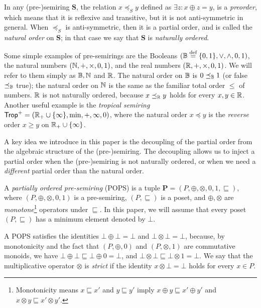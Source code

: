 In any (pre-)semiring $\bm S$, the relation $x \preceq_S y$ defined as
$\exists z: x \oplus z = y$, is a {\em preorder}, which means that it
is reflexive and transitive, but it is not anti-symmetric in general.
When $\preceq_S$ is anti-symmetric, then it is a partial order, and is
called the {\em natural order} on $\bm S$; in that case we say that
$\bm S$ is {\em naturally ordered}.

\begin{ex}
  Some simple examples of pre-semirings are the Booleans
  $(\mathbb B \stackrel{\text{def}}{=} \{0,1\}, \vee, \wedge, 0, 1)$, the natural numbers
  $(\mathbb N, +, \times , 0, 1)$, and the real numbers
  $(\mathbb R, +, \times, 0, 1)$.  We will refer to them simply as $\mathbb B, \mathbb N$
  and $\mathbb R$.  The natural order on $\mathbb B$ is $0 \preceq_\mathbb B 1$ (or {\sf
    false} $\preceq_\mathbb B$ {\sf true}); the natural order on $\mathbb N$ is the
  same as the familiar total order $\leq$ of numbers.  $\mathbb R$ is not
  naturally ordered, because $x \preceq_\mathbb R y$ holds for every
  $x,y \in \mathbb R$.  Another useful example is the {\em tropical semiring}
  $\text{\sf Trop}^+ = (\mathbb R_+ \cup \{\infty\}, \min,+, \infty, 0)$, where the
  natural order $x \preceq y$ is the {\em reverse} order $x \geq y$ on
  $\mathbb R_+ \cup \{\infty\}$.
\end{ex}


A key idea we introduce in this paper is the decoupling of the partial order from the
algebraic structure of the (pre-)semiring.
The decoupling allows us to inject a partial order when the (pre-)semiring is not
naturally ordered, or when we need a {\em different} partial order than the natural order.

\begin{defn}[POPS] \label{def:pops} A {\em partially ordered pre-semiring} (POPS) is a tuple
  $\bm P = (P, \oplus, \otimes, 0, 1, \sqsubseteq)$, where
  $(P, \oplus, \otimes, 0, 1)$ is a pre-semiring, $(P, \sqsubseteq)$
  is a poset, and $\oplus, \otimes$ are {\em monotone}\footnote{Monotonicity means
  $x\sqsubseteq x'$ and $y \sqsubseteq y'$ imply $x\oplus y \sqsubseteq x' \oplus y'$
  and $x \otimes y \sqsubseteq x' \otimes y'$.}
  operators under $\sqsubseteq$.
  In this paper, we will assume that every poset $(P, \sqsubseteq)$ has a minimum
  element denoted by $\bot$.
\end{defn}

A POPS satisfies the identities $\bot \oplus \bot = \bot$ and
$\bot \otimes \bot = \bot$, because, by monotonicity and the fact that
$(P,\oplus,0)$ and $(P,\otimes,1)$ are commutative monoids, we have
$\bot \oplus \bot \sqsubseteq \bot \oplus 0 = \bot$, and
$\bot \otimes \bot \sqsubseteq \bot \otimes 1 = \bot$.  We say that
the multiplicative operator $\otimes$ is {\em strict} if the identity
$x \otimes \bot = \bot$ holds for every $x \in P$.

